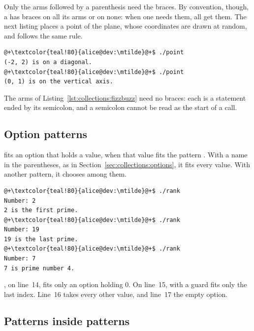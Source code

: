 Only the arms followed by a parenthesis need the braces. By convention, though,
a  has braces on all its arms or on none: when one needs them, all
get them. The next listing places a point of the plane, whose coordinates are
drawn at random, and follows the same rule.


\vspace{-10pt}%
\begin{lstlisting}[style=bashVerb, escapechar=@+]
@+\textcolor{teal!80}{alice@dev:\mtilde}@+$ ./point
(-2, 2) is on a diagonal.
@+\textcolor{teal!80}{alice@dev:\mtilde}@+$ ./point
(0, 1) is on the vertical axis.
\end{lstlisting}

The arms of Listing~\ref{lst:collections:fizzbuzz} need no braces: each is a
statement ended by its semicolon, and a semicolon cannot be read as the start of
a call.

\subsection{Option patterns}

 fits an option that holds a value, when that value fits the
pattern . With a name in the parentheses, as in
Section~\ref{sec:collections:options}, it fits every value. With another
pattern, it chooses among them.


\vspace{-10pt}%
\begin{lstlisting}[style=bashVerb, escapechar=@+]
@+\textcolor{teal!80}{alice@dev:\mtilde}@+$ ./rank
Number: 2
2 is the first prime.
@+\textcolor{teal!80}{alice@dev:\mtilde}@+$ ./rank
Number: 19
19 is the last prime.
@+\textcolor{teal!80}{alice@dev:\mtilde}@+$ ./rank
Number: 7
7 is prime number 4.
\end{lstlisting}

, on line~14, fits only an option holding 0. On line~15,
 with a guard fits only the last index. Line~16 takes every other
value, and line~17 the empty option.

\subsection{Patterns inside patterns}

